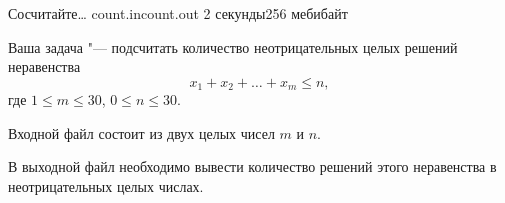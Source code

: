 \begin{problem}{Сосчитайте\ldots}
{count.in}{count.out}
{2 секунды}{256 мебибайт}

Ваша задача "--- подсчитать количество неотрицательных целых решений неравенства
$$x_1+x_2+\ldots+x_m \le n,$$
где $1\le m\le 30$, $0\le n\le 30$.

\InputFile

Входной файл состоит из двух целых чисел $m$ и $n$.

\OutputFile

В выходной файл необходимо вывести количество решений этого неравенства в
неотрицательных целых числах.

\Example

\begin{example}
%
\end{example}

\end{problem}
